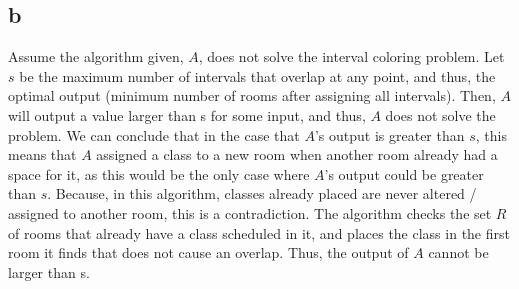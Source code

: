 \documentclass[letterpaper,notitlepage,twoside]{article}
\begin{document}
\subsection*{b}
Assume the algorithm given, $A$, does not solve the interval coloring problem. Let $s$ be the maximum number of intervals that overlap at any point, and thus, the optimal output (minimum number of rooms after assigning all intervals). Then, $A$ will output a value larger than s for some input, and thus, $A$ does not solve the problem. We can conclude that in the case that $A$'s output is greater than $s$, this means that $A$ assigned a class to a new room when another room already had a space for it, as this would be the only case where $A$'s output could be greater than $s$. Because, in this algorithm, classes already placed are never altered / assigned to another room, this is a contradiction. The algorithm checks the set $R$ of rooms that already have a class scheduled in it, and places the class in the first room it finds that does not cause an overlap. Thus, the output of $A$ cannot be larger than s. 
~\\ \par
\end{document}
